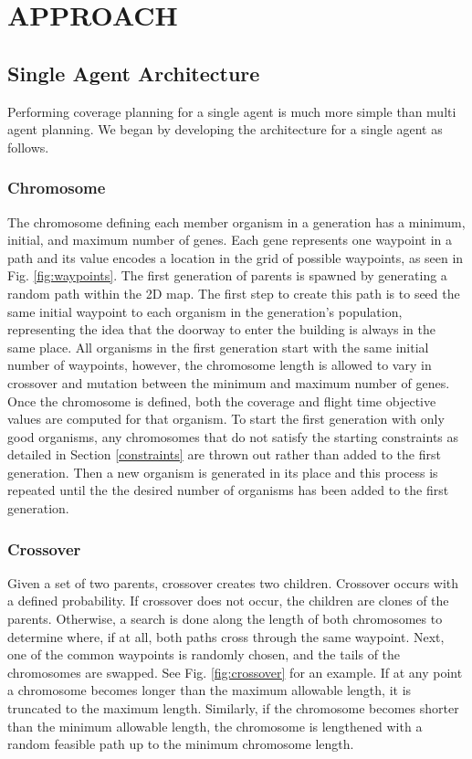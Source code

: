 \documentclass[letterpaper, 10 pt, conference]{ieeeconf}  %
\begin{document}
\section{APPROACH}\label{approach}
\subsection{Single Agent Architecture}

Performing coverage planning for a single agent is much more simple than multi agent planning. We began by developing the architecture for a single agent as follows.

\subsubsection{Chromosome}

The chromosome defining each member organism in a generation has a minimum, initial, and maximum number of genes. Each gene represents one waypoint in a path and its value encodes a location in the grid of possible waypoints, as seen in Fig. \ref{fig:waypoints}. The first generation of parents is spawned by generating a random path within the 2D map. The first step to create this path is to seed the same initial waypoint to each organism in the generation's population, representing the idea that the doorway to enter the building is always in the same place. All organisms in the first generation start with the same initial number of waypoints, however, the chromosome length is allowed to vary in crossover and mutation between the minimum and maximum number of genes. Once the chromosome is defined, both the coverage and flight time objective values are computed for that organism. To start the first generation with only good organisms, any chromosomes that do not satisfy the starting constraints as detailed in Section \ref{constraints} are thrown out rather than added to the first generation. Then a new organism is generated in its place and this process is repeated until the the desired number of organisms has been added to the first generation.

\subsubsection{Crossover}

Given a set of two parents, crossover creates two children. Crossover occurs with a defined probability. If crossover does not occur, the children are clones of the parents. Otherwise, a search is done along the length of both chromosomes to determine where, if at all, both paths cross through the same waypoint. Next, one of the common waypoints is randomly chosen, and the tails of the chromosomes are swapped. See Fig. \ref{fig:crossover} for an example. If at any point a chromosome becomes longer than the maximum allowable length, it is truncated to the maximum length. Similarly, if the chromosome becomes shorter than the minimum allowable length, the chromosome is lengthened with a random feasible path up to the minimum chromosome length.
\end{document}
